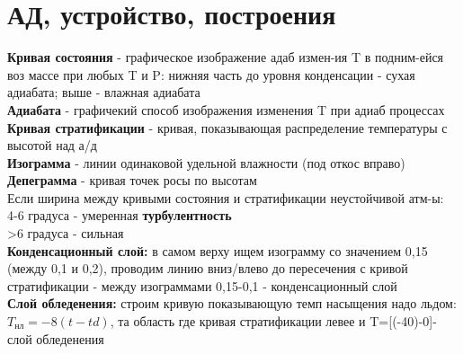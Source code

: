 
\section{АД, устройство, построения}
\textbf{Кривая состояния} - графическое изображение адаб измен-ия T в подним-ейся воз массе при любых T и P: нижняя часть до уровня конденсации - сухая адиабата; выше - влажная адиабата\\
\textbf{Адиабата} - графичекий способ изображения изменения T при адиаб процессах\\
\textbf{Кривая стратификации} - кривая, показывающая распределение температуры с высотой над а/д\\
\textbf{Изограмма} - линии одинаковой удельной влажности (под откос вправо)\\
\textbf{Депеграмма} - кривая точек росы по высотам\\

Если ширина между кривыми состояния и стратификации неустойчивой атм-ы:\\
 4-6 градуса - умеренная \textbf{турбулентность}\\
 >6 градуса - сильная\\
 
\textbf{Конденсационный слой:} в самом верху ищем изограмму со значением 0,15 (между 0,1 и 0,2), проводим линию вниз/влево до пересечения с кривой стратификации - между изограммами 0,15-0,1 - конденсационный слой\\

\textbf{Слой обледенения:} строим кривую показывающую темп насыщения надо льдом: $T_\text{нл}=-8(t-td)$, та область где кривая стратификации левее и T=[(-40)-0]- слой обледенения
 
 